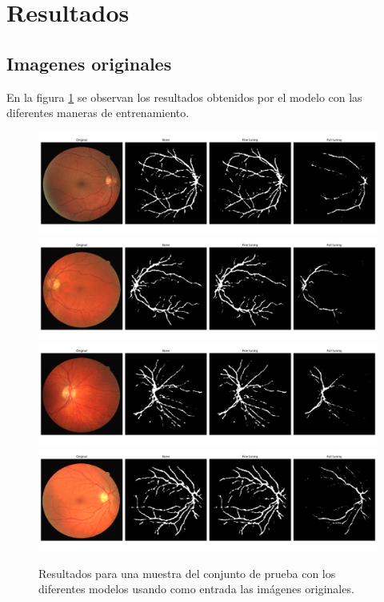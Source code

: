 \pagebreak
\section{Resultados}

\subsection{Imagenes originales}

En la figura \ref{fig:normal_results} se observan los resultados obtenidos por el modelo con las diferentes maneras de entrenamiento.

\begin{figure}[H]
    \centering
    \includegraphics[width=14cm]{Graphics/normal/04.png}
    \includegraphics[width=14cm]{Graphics/normal/06.png}
    \includegraphics[width=14cm]{Graphics/normal/10.png}
    \includegraphics[width=14cm]{Graphics/normal/14.png}
    \caption{Resultados para una muestra del conjunto de prueba con los diferentes modelos usando como entrada las imágenes originales.}
    \label{fig:normal_results}
\end{figure}

